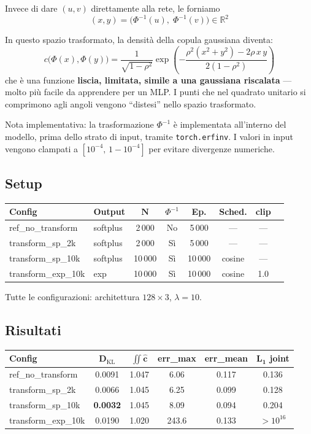 \documentclass[11pt, a4paper]{article}
\begin{document}
Invece di dare $(u,v)$ direttamente alla rete, le forniamo
\[
(x, y) = \bigl(\Phi^{-1}(u),\; \Phi^{-1}(v)\bigr) \in \mathbb{R}^2
\]

In questo spazio trasformato, la densità della copula gaussiana diventa:
\[
c\bigl(\Phi(x), \Phi(y)\bigr) = \frac{1}{\sqrt{1-\rho^2}} \exp\!\left(-\frac{\rho^2(x^2+y^2) - 2\rho\, x\, y}{2(1-\rho^2)}\right)
\]
che è una funzione \textbf{liscia, limitata, simile a una gaussiana riscalata} --- molto più facile da apprendere per un MLP. I punti che nel quadrato unitario si comprimono agli angoli vengono ``distesi'' nello spazio trasformato.

Nota implementativa: la trasformazione $\Phi^{-1}$ è implementata all'interno del modello, prima dello strato di input, tramite \texttt{torch.erfinv}. I valori in input vengono clampati a $[10^{-4},\, 1-10^{-4}]$ per evitare divergenze numeriche.

\subsection{Setup}

\begin{center}
\begin{tabular}{llcccccc}
\toprule
\textbf{Config} & \textbf{Output} & $\boldsymbol{N}$ & \textbf{$\Phi^{-1}$} & \textbf{Ep.} & \textbf{Sched.} & \textbf{clip} \\
\midrule
ref\_no\_transform  & softplus & 2\,000  & No & 5\,000 & --- & --- \\
transform\_sp\_2k   & softplus & 2\,000  & Sì & 5\,000 & --- & --- \\
transform\_sp\_10k  & softplus & 10\,000 & Sì & 10\,000 & cosine & --- \\
transform\_exp\_10k & exp      & 10\,000 & Sì & 10\,000 & cosine & 1.0 \\
\bottomrule
\end{tabular}
\end{center}

Tutte le configurazioni: architettura $128 \times 3$, $\lambda = 10$.

\subsection{Risultati}

\begin{center}
\begin{tabular}{lccccc}
\toprule
\textbf{Config} & $\boldsymbol{D_\mathrm{KL}}$ & $\boldsymbol{\iint \hat{c}}$ & \textbf{err\_max} & \textbf{err\_mean} & $\boldsymbol{L_1}$ \textbf{joint} \\
\midrule
ref\_no\_transform  & 0.0091 & 1.047 & 6.06  & 0.117 & 0.136 \\
transform\_sp\_2k   & 0.0066 & 1.045 & 6.25  & 0.099 & 0.128 \\
transform\_sp\_10k  & \textbf{0.0032} & 1.045 & 8.09  & 0.094 & 0.204 \\
transform\_exp\_10k & 0.0190 & 1.020 & 243.6 & 0.133 & $>10^{16}$ \\
\bottomrule
\end{tabular}
\end{center}
\end{document}
